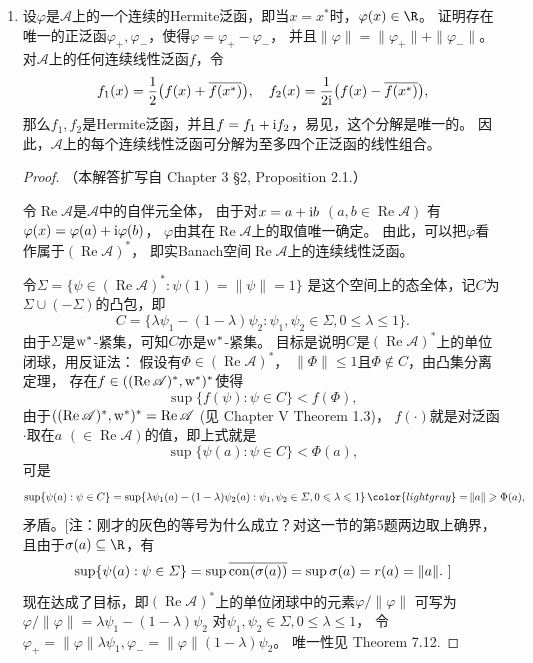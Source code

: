 \begin{enumerate}
\begin{proof}
由这一节习题1及Krein--Milman定理，$\varSigma(C^*(a))=\overline{\con\{\varphi:\varphi\in \Delta_{C^*(a)}\}}$，
从而$\{\varphi(a):\varphi\in \varSigma(\mathscr{A})\}
=\overline{\con\{\varphi(a):\varphi\in \Delta_{C^*(a)}\}}=\overline{\con(\sigma(a))}$.
\end{proof}

\item[8]
设$\varphi$是$\mathscr{A}$上的一个连续的Hermite泛函，即当$x=x^*$时，$\varphi(x)\in\R$。
证明存在唯一的正泛函$\varphi_+,\varphi_-$，使得$\varphi=\varphi_+-\varphi_-$，
并且$\|\varphi\|=\|\varphi_+\|+\|\varphi_-\|$。对$\mathscr{A}$上的任何连续线性泛函$f$，令
\[f_1(x)=\frac{1}{2}\big(f(x)+\overline{f(x^*)}\big), \quad 
f_2(x)=\frac{1}{2{\rm i}}\big(f(x)-\overline{f(x^*)}\big),\]
那么$f_1,f_2$是Hermite泛函，并且$f=f_1+{\rm i}f_2$，易见，这个分解是唯一的。
因此，$\mathscr{A}$上的每个连续线性泛函可分解为至多四个正泛函的线性组合。
\begin{proof}
（本解答扩写自\cite{Takesaki} Chapter 3 \S2, Proposition 2.1.）

令$\operatorname{Re}\mathscr{A}$是$\mathscr{A}$中的自伴元全体，
由于对$x=a+{\rm i}b$ $(a,b\in\operatorname{Re}\mathscr{A})$
有$\varphi(x)=\varphi(a)+{\rm i}\varphi(b)$，
$\varphi$由其在$\operatorname{Re}\mathscr{A}$上的取值唯一确定。
由此，可以把$\varphi$看作属于$(\operatorname{Re}\mathscr{A})^*$，
即实Banach空间$\operatorname{Re}\mathscr{A}$上的连续线性泛函。

令$\varSigma=\{\psi\in(\operatorname{Re}\mathscr{A})^*:\psi(1)=\|\psi\|=1\}$
是这个空间上的态全体，记$C$为$\varSigma\cup(-\varSigma)$的凸包，即
\[C=\{\lambda\psi_1-(1-\lambda)\psi_2:\psi_1,\psi_2\in\varSigma,0\leqslant\lambda\leqslant1\}.\]
由于$\varSigma$是${\rm w}^*$-紧集，可知$C$亦是${\rm w}^*$-紧集。
目标是说明$C$是$(\operatorname{Re}\mathscr{A})^*$上的单位闭球，用反证法：
假设有$\Phi\in(\operatorname{Re}\mathscr{A})^*$，
$\|\Phi\|\leqslant1$且$\Phi \notin C$，由凸集分离定理，
存在$f\in((\operatorname{Re}\mathscr{A})^*,{\rm w}^*)^*$使得
\[\sup\{f(\psi):\psi \in C\}<f(\Phi),\]
由于$((\operatorname{Re}\mathscr{A})^*,{\rm w}^*)^*=\operatorname{Re}\mathscr{A}$ 
(见\cite{Conway I} Chapter V Theorem 1.3)，
$f(\cdot)$就是对泛函$\cdot$取在$a$ $(\in\operatorname{Re}\mathscr{A})$的值，即上式就是
\[\sup\{\psi(a):\psi \in C\}<\Phi(a),\]
可是\[\sup\{\psi(a):\psi \in C\}=\sup\{\lambda\psi_1(a)-(1-\lambda)\psi_2(a):
\psi_1,\psi_2\in\varSigma,0\leqslant\lambda\leqslant1\}
\,{\color{lightgray}=}\,\|a\|\geqslant\Phi(a),\]
矛盾。$[$注：刚才的灰色的等号为什么成立？对这一节的第5题两边取上确界，且由于$\sigma(a)\subseteq\R$，有
\[\sup\{\psi(a):\psi\in\varSigma\}=\sup\overline{\operatorname{con}(\sigma(a))}
=\sup\sigma(a)=r(a)=\|a\|.\ ]\]
现在达成了目标，即$(\operatorname{Re}\mathscr{A})^*$上的单位闭球中的元素$\varphi/\|\varphi\|$
可写为$\varphi/\|\varphi\|=\lambda\psi_1-(1-\lambda)\psi_2$
对$\psi_1,\psi_2\in\varSigma,0\leqslant\lambda\leqslant1$，
令$\varphi_+=\|\varphi\|\lambda\psi_1,\varphi_-=\|\varphi\|(1-\lambda)\psi_2$。
唯一性见\cite{Conway II} Theorem 7.12.
\end{proof}
\end{enumerate}

